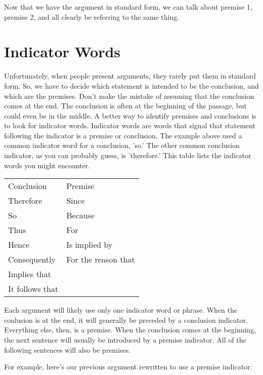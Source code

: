  Now that we have the argument in standard form, we can talk about premise 1, premise 2, and all clearly be referring to the same thing.

\section{Indicator Words}
\label{sec:indicator-words}

Unfortunately, when people present arguments, they rarely put them in standard form. So, we have to decide which statement is intended to be the conclusion, and which are the premises. Don't make the mistake of assuming that the conclusion comes at the end. The conclusion is often at the beginning of the passage, but could even be in the middle. A better way to identify premises and conclusions is to look for indicator words. Indicator words are words that signal that statement following the indicator is a premise or conclusion. The example above used a common indicator word for a conclusion, 'so.' The other common conclusion indicator, as you can probably guess, is 'therefore.' This table lists the indicator words you might encounter.

\begin{table}[]
\begin{tabular}{@{}ll@{}}
Conclusion      & Premise             \\
Therefore       & Since               \\
So              & Because             \\
Thus            & For                 \\
Hence           & Is implied by       \\
Consequently    & For the reason that \\
Implies that    &                     \\
It follows that &                    
\end{tabular}
\end{table}

Each argument will likely use only one indicator word or phrase. When the conlusion is at the end, it will generally be preceded by a conclusion indicator. Everything else, then, is a premise. When the conclusion comes at the beginning, the next sentence will usually be introduced by a premise indicator. All of the following sentences will also be premises.

For example, here's our previous argument rewritten to use a premise indicator:

